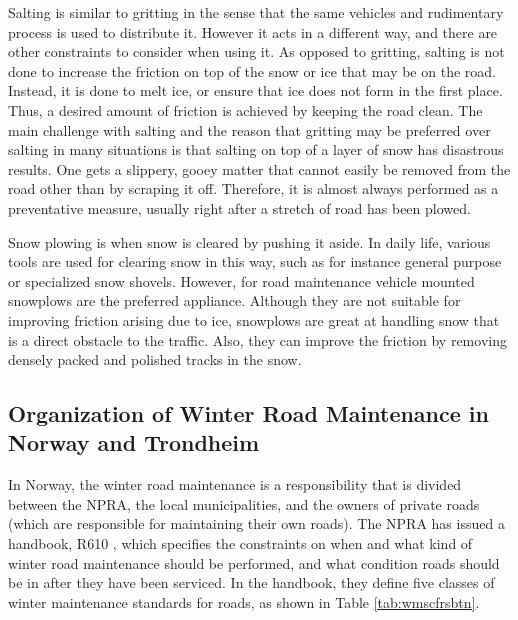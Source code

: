 Salting is similar to gritting in the sense that the same vehicles and rudimentary process is used to distribute it. However it acts in a different way, and there are other constraints to consider when using it. As opposed to gritting, salting is not done to increase the friction on top of the snow or ice that may be on the road. Instead, it is done to melt ice, or ensure that ice does not form in the first place. Thus, a desired amount of friction is achieved by keeping the road clean. The main challenge with salting and the reason that gritting may be preferred over salting in many situations is that salting on top of a layer of snow has disastrous results. One gets a slippery, gooey matter that cannot easily be removed from the road other than by scraping it off. Therefore, it is almost always performed as a preventative measure, usually right after a stretch of road has been plowed.

Snow plowing is when snow is cleared by pushing it aside. In daily life, various tools are used for clearing snow in this way, such as for instance general purpose or specialized snow shovels. However, for road maintenance vehicle mounted snowplows are the preferred appliance. Although they are not suitable for improving friction arising due to ice, snowplows are great at handling snow that is a direct obstacle to the traffic. Also, they can improve the friction by removing densely packed and polished tracks in the snow.

\subsection{Organization of Winter Road Maintenance in Norway and Trondheim} %
\label{ssub:how_winter_road_maintenance_is_organized_in_norway_and_trondheim}


In Norway, the winter road maintenance is a responsibility that is divided between the NPRA, the local municipalities, and the owners of private roads (which are responsible for maintaining their own roads). The NPRA has issued a handbook, R610 \citep{svvR610}, which specifies the constraints on when and what kind of winter road maintenance should be performed, and what condition roads should be in after they have been serviced. In the handbook, they define five classes of winter maintenance standards for roads, as shown in Table \ref{tab:wmscfrsbtn}.

